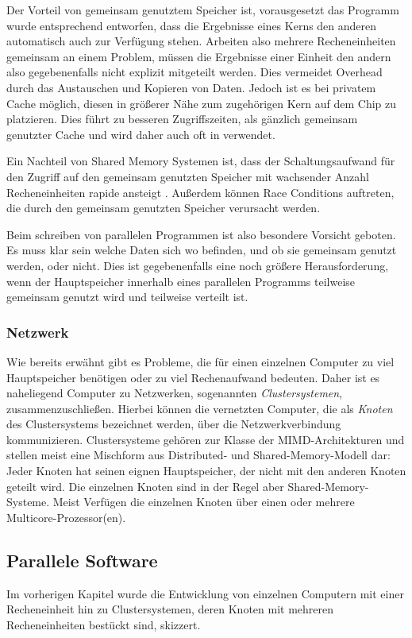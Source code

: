 	Der Vorteil von gemeinsam genutztem Speicher ist, vorausgesetzt das Programm wurde entsprechend entworfen, dass die Ergebnisse eines Kerns den anderen automatisch auch zur Verfügung stehen. 
	Arbeiten  also mehrere Recheneinheiten gemeinsam an einem Problem, müssen die Ergebnisse einer Einheit den andern also gegebenenfalls nicht explizit mitgeteilt werden. Dies vermeidet Overhead
	durch das Austauschen und Kopieren von Daten.
	Jedoch ist es bei privatem Cache möglich, diesen in größerer Nähe zum zugehörigen Kern auf dem Chip zu platzieren. Dies führt zu besseren Zugriffszeiten, als gänzlich gemeinsam genutzter 
	Cache und wird daher auch oft in verwendet. 
	
	Ein Nachteil von Shared Memory Systemen ist, dass der Schaltungsaufwand für den Zugriff auf den gemeinsam genutzten Speicher mit wachsender Anzahl Recheneinheiten rapide ansteigt
	\citep{hpcskript}. Außerdem können Race Conditions auftreten, die durch den gemeinsam genutzten Speicher verursacht werden.
	
	Beim schreiben von parallelen Programmen ist also besondere Vorsicht geboten. Es muss klar sein welche Daten sich wo befinden, und ob sie gemeinsam genutzt werden, oder nicht.
	Dies ist gegebenenfalls eine noch größere Herausforderung, wenn der Hauptspeicher innerhalb eines parallelen Programms teilweise gemeinsam genutzt wird und teilweise verteilt ist.
	
      \subsubsection{Netzwerk}
      \label{sec:netzwerk}
		
	Wie bereits erwähnt gibt es Probleme, die für einen einzelnen Computer zu viel Hauptspeicher benötigen oder zu viel Rechenaufwand bedeuten. Daher ist es naheliegend Computer zu Netzwerken,
	sogenannten \textit{Clustersystemen}, zusammenzuschließen. Hierbei können die vernetzten Computer, die als \textit{Knoten} des Clustersystems bezeichnet werden, über die 
	Netzwerkverbindung kommunizieren. Clustersysteme gehören zur Klasse der MIMD-Architekturen und stellen meist eine Mischform aus Distributed- und Shared-Memory-Modell dar: Jeder Knoten hat 
	seinen eignen Hauptspeicher, der nicht mit den anderen Knoten geteilt wird. Die einzelnen Knoten sind in der Regel aber Shared-Memory-Systeme. Meist Verfügen die einzelnen Knoten über
	einen oder mehrere Multicore-Prozessor(en). \citep{cluster}
	
    \subsection{Parallele Software}
      Im vorherigen Kapitel wurde die Entwicklung von einzelnen Computern mit einer Recheneinheit hin zu Clustersystemen, deren Knoten mit mehreren Recheneinheiten bestückt sind, skizzert.
      
